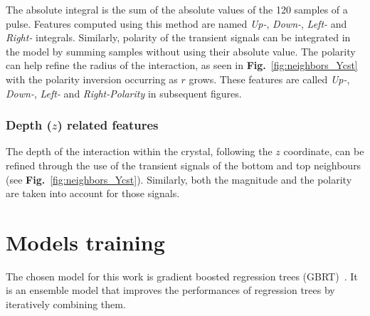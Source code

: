 The absolute integral is the sum of the absolute values of the 120 samples of a pulse. Features computed using this method are named \textit{Up-}, \textit{Down-}, \textit{Left-} and \textit{Right-} integrals. Similarly, polarity of the transient signals can be integrated in the model by summing samples without using their absolute value. The polarity can help refine the radius of the interaction, as seen in \textbf{Fig.}~\ref{fig:neighbors_Ycst} with the polarity inversion occurring as $r$ grows. These features are called \textit{Up-}, \textit{Down-}, \textit{Left-} and \textit{Right-Polarity} in subsequent figures.

\subsubsection{Depth ($z$) related features}
The depth of the interaction within the crystal, following the $z$ coordinate, can be refined through the use of the transient signals of the bottom and top neighbours (see \textbf{Fig.}~\ref{fig:neighbors_Ycst}). Similarly, both the magnitude and the polarity are taken into account for those signals.


\section{Models training}
\label{sec:models_training}
The chosen model for this work is gradient boosted regression trees (GBRT)~\cite{Friedman2001GreedyMachine.}. It is an ensemble model that improves the performances of regression trees by iteratively combining them. 

